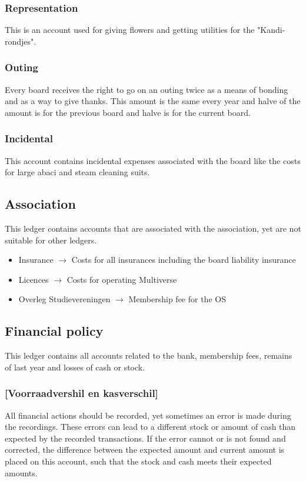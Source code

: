 \documentclass{report}
\begin{document}
\subsubsection{Representation}
This is an account used for giving flowers and getting utilities for the "Kandi-rondjes".
\subsubsection{Outing}
Every board receives the right to go on an outing twice as a means of bonding and as a way to give thanks. This amount is the same every year and halve of the amount is for the previous board and halve is for the current board. 
\subsubsection{Incidental}
This account contains incidental expenses associated with the board like the costs for large abaci and steam cleaning suits. 
\subsection{Association}
This ledger contains accounts that are associated with the association, yet are not suitable for other ledgers. 
\begin{itemize}
	\item Insurance $\rightarrow$ Costs for all insurances including the board liability insurance
	\item Licences $\rightarrow$ Costs for operating Multiverse
	\item Overleg Studievereningen $\rightarrow$ Membership fee for the OS
\end{itemize}
\subsection{Financial policy}
This ledger contains all accounts related to the bank, membership fees, remains of last year and losses of cash or stock.
\subsubsection{[Voorraadvershil en kasverschil]}
All financial actions should be recorded, yet sometimes an error is made during the recordings. These errors can lead to a different stock or amount of cash than expected by the recorded transactions. If the error cannot or is not found and corrected, the difference between the expected amount and current amount is placed on this account, such that the stock and cash meets their expected amounts. 
\end{document}
